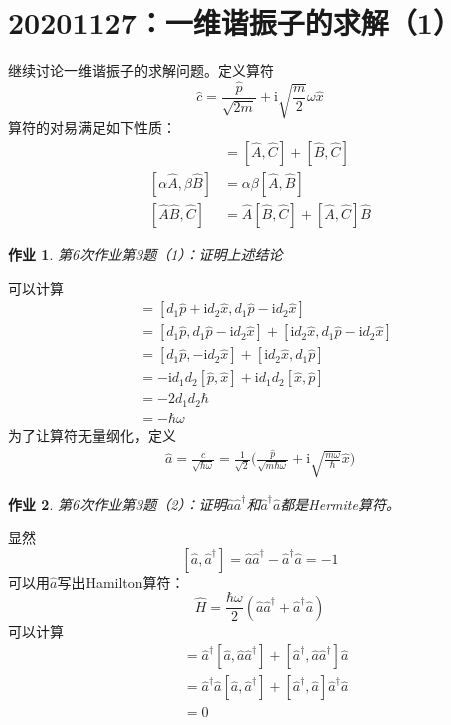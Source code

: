 \documentclass[12pt]{article}
\newtheorem{asg}{作业}
\begin{document}
\section{20201127：一维谐振子的求解（1）}

    继续讨论一维谐振子的求解问题。定义算符
    \[ \hat{c} = \frac {\hat{p}}{\sqrt{2m}} + \mathrm{i}\sqrt{\frac m2}\omega \hat{x} \]
    算符的对易满足如下性质：
    \begin{align*}
        [\hat{A}+\hat{B},\hat{C}] &= [\hat{A},\hat{C}]+[\hat{B},\hat{C}]\\
        [\alpha \hat{A}, \beta \hat{B}] &= \alpha \beta [\hat{A},\hat{B}]\\
        [\hat{A}\hat{B},\hat{C}] &= \hat{A}[\hat{B},\hat{C}] + [\hat{A},\hat{C}]\hat{B}
    \end{align*}
    \begin{asg}
        第6次作业第3题（1）：证明上述结论
    \end{asg}
    可以计算
    \begin{align*}
        [\hat{c},\hat{c}^\dagger] &= [d_1\hat{p} +\mathrm{i}d_2\hat{x}, d_1\hat{p} - \mathrm{i}d_2\hat{x}]\\
        &= [d_1\hat{p}, d_1\hat{p} - \mathrm{i}d_2\hat{x}] + [\mathrm{i}d_2\hat{x}, d_1\hat{p} - \mathrm{i}d_2\hat{x}]\\
        &= [d_1\hat{p}, -\mathrm{i}d_2\hat{x}] + [\mathrm{i}d_2\hat{x}, d_1\hat{p}]\\
        &= -\mathrm{i}d_1d_2[\hat{p},\hat{x}] + \mathrm{i}d_1d_2[\hat{x},\hat{p}]\\
        &= -2d_1d_2\hbar\\
        &= -\hbar \omega
    \end{align*}
    为了让算符无量纲化，定义
    \begin{align*}
        \hat{a} = \frac {\hat{c}}{\sqrt{\hbar \omega}} =\frac 1{\sqrt{2}} \bigg(\frac {\hat{p}}{\sqrt{m\hbar\omega}} + \mathrm{i}\sqrt{\frac {m\omega}{\hbar}} \hat{x}\bigg)
    \end{align*}
    \begin{asg}
        第6次作业第3题（2）：证明$\hat{a}\hat{a}^\dagger$和$\hat{a}^\dagger\hat{a}$都是Hermite算符。
    \end{asg}
    显然
    \[ [\hat{a},\hat{a}^\dagger] = \hat{a}\hat{a}^\dagger - \hat{a}^\dagger \hat{a} =  -1 \]
    可以用$\hat{a}$写出Hamilton算符：
    \[ \hat{H} = \frac {\hbar \omega}2 (\hat{a}\hat{a}^\dagger + \hat{a}^\dagger \hat{a}) \]
    可以计算
    \begin{align*}
        [\hat{a}^\dagger\hat{a}, \hat{a}\hat{a}^\dagger] &= \hat{a}^\dagger [\hat{a},\hat{a}\hat{a}^\dagger] +  [\hat{a}^\dagger,\hat{a}\hat{a}^\dagger]\hat{a}\\
        &= \hat{a}^\dagger\hat{a}[\hat{a},\hat{a}^\dagger] + [\hat{a}^\dagger,\hat{a}]\hat{a}^\dagger \hat{a}\\
        &= 0
    \end{align*}
\end{document}
